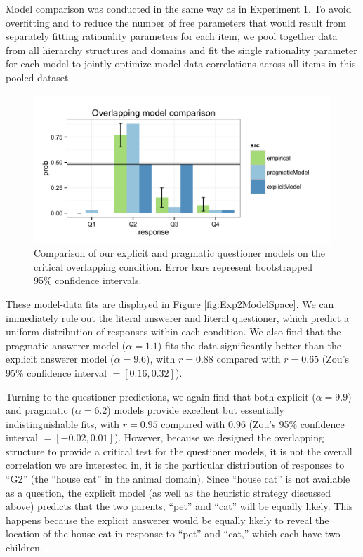 \documentclass[12pt, floatsintext, jou]{apa6}
\begin{document}
Model comparison was conducted in the same way as in Experiment 1. To avoid overfitting and to reduce the number of free parameters that would result from separately fitting rationality parameters for each item, we pool together data from all hierarchy structures and domains and fit the single rationality parameter for each model to jointly optimize model-data correlations across all items in this pooled dataset. 
%
\begin{figure}[t!]
\begin{center}
\includegraphics[scale=.25]{OverlappingModelComparison.png}
\end{center}
\vspace{-.5cm}
\caption{Comparison of our explicit and pragmatic questioner models on the critical overlapping condition.  Error bars represent bootstrapped 95\% confidence intervals.}
\label{fig:Exp4ZoomedIn}
\vspace{-.15cm}
\end{figure}
%
These model-data fits are displayed in Figure \ref{fig:Exp2ModelSpace}. We can immediately rule out the literal answerer and literal questioner, which predict a uniform distribution of responses within each condition. We also find that the pragmatic answerer model ($\alpha = 1.1$) fits the data significantly better than the explicit answerer model ($\alpha = 9.6$), with $r = 0.88$ compared with $r = 0.65$ (Zou's 95\% confidence interval $= [0.16, 0.32]$). 

Turning to the questioner predictions, we again find that both explicit ($\alpha = 9.9$) and pragmatic ($\alpha = 6.2$) models provide excellent but essentially indistinguishable fits, with $r = 0.95$ compared with $0.96$ (Zou's 95\% confidence interval $= [-0.02, 0.01]$). However, because we designed the overlapping structure to provide a critical test for the questioner models, it is not the overall correlation we are interested in, it is the particular distribution of responses to ``G2'' (the ``house cat'' in the animal domain). Since ``house cat'' is not available as a question, the explicit model (as well as the heuristic strategy discussed above) predicts that the two parents, ``pet'' and ``cat'' will be equally likely. This happens because the explicit answerer would be equally likely to reveal the location of the house cat in response to ``pet'' and ``cat,'' which each have two children. 
\end{document}
